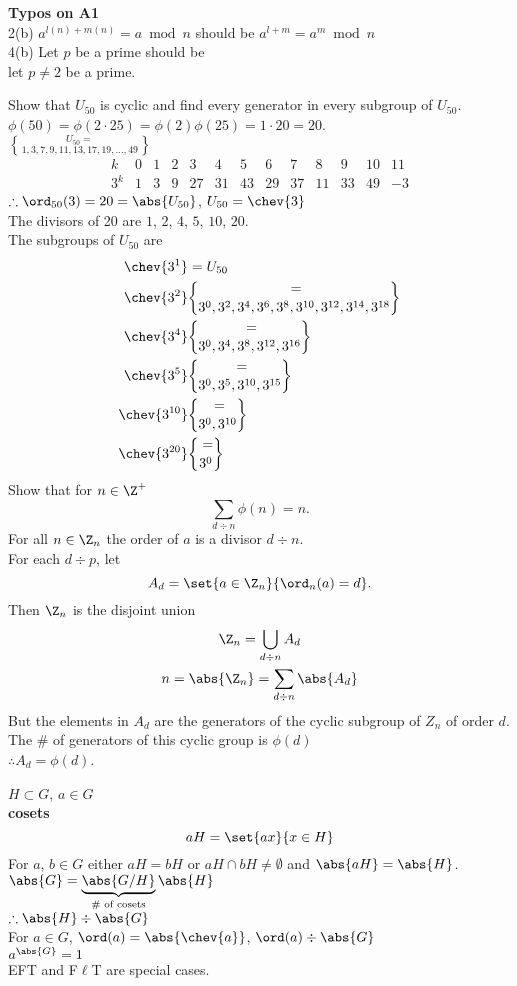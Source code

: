 \textbf{Typos on A1} \\
2(b) $a^{l(n)+m(n)}=a\bmod n$ should be $a^{l+m}=a^m\bmod n$ \\
4(b) Let $p$ be a prime should be \\
let $p\neq2$ be a prime.

\eg Show that $U_{50}$ is cyclic and find every generator in every subgroup of $U_{50}$. \\
\soln $\phi(50)=\phi(2\cdot25)=\phi(2)\phi(25)=1\cdot20=20$. \\
$U_{50}=\brace{1,3,7,9,11,13,17,19,\dotsc,49}$
\[ \begin{array}{c|cccccccccccc}
k & 0 & 1 & 2 & 3 & 4 & 5 & 6 & 7 & 8 & 9 & 10 & 11 \\ \hline
3^k & 1 & 3 & 9 & 27 & 31 & 43 & 29 & 37 & 11 & 33 & 49 & -3
\end{array} \]
$\therefore\ord_{50}(3)=20=\abs{U_{50}}$, $U_{50}=\chev{3}$ \\
The divisors of 20 are $1$, $2$, $4$, $5$, $10$, $20$. \\
The subgroups of $U_{50}$ are
\begin{align*}
\chev{3^1} &= U_{50} \\
\chev{3^2} &= \brace{3^0,3^2,3^4,3^6,3^8,3^{10},3^{12},3^{14},3^{18}} \\
\chev{3^4} &= \brace{3^0,3^4,3^8,3^{12},3^{16}} \\
\chev{3^5} &= \brace{3^0,3^5,3^{10},3^{15}} \\
\chev{3^{10}} &= \brace{3^0,3^{10}} \\
\chev{3^{20}} &= \brace{3^0}
\end{align*}
\eg Show that for $n\in\Z^+$
\[ \sum_{d\div n}\phi(n) = n . \]
\soln For all $n\in\Z_n$ the order of $a$ is a divisor $d\div n$. \\
For each $d\div p$, let
\[ A_d = \set{a\in\Z_n}{\ord_n(a)=d} . \]
Then $\Z_n$ is the disjoint union
\begin{gather*}
\Z_n = \bigcup_{d\div n}A_d \\
n = \abs{\Z_n} = \sum_{d\div n}\abs{A_d}
\end{gather*}
But the elements in $A_d$ are the generators of the cyclic subgroup of $Z_n$ of order $d$. \\
The \# of generators of this cyclic group is $\phi(d)$ \\
$\therefore A_d = \phi(d)$.

$H\subset G$, $a\in G$ \\
\textbf{cosets}
\[ aH = \set{ax}{x\in H} \]
For $a$, $b\in G$ either $aH=bH$ or $aH\cap bH\neq\emptyset$ and $\abs{aH}=\abs{H}$. \\
$\abs{G}=\underbrace{\abs{G/H}}_{\text{\# of cosets}}\abs{H}$ \\
$\therefore\abs{H}\div\abs{G}$ \\
For $a\in G$, $\ord(a)=\abs{\chev{a}}$, $\ord(a)\div\abs{G}$ \\
$a^{\abs{G}}=1$ \\
EFT and F$\ell$T are special cases.

